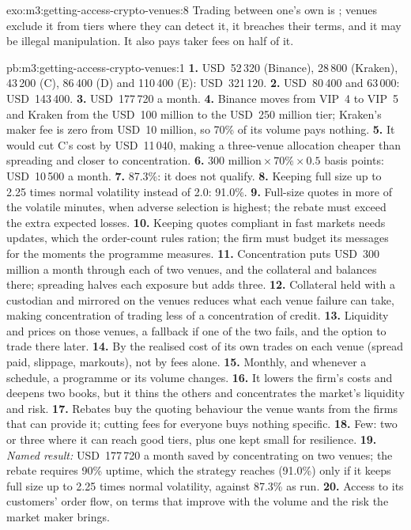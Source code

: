 \begin{solution}{exo:m3:getting-access-crypto-venues:8}
Trading between one's own  is ; venues exclude it from tiers where they can detect it, it breaches their terms, and it may
be illegal manipulation. It also pays taker fees on half of it.
\end{solution}

\begin{solution}{pb:m3:getting-access-crypto-venues:1}
\textbf{1.} USD~52\,320 (Binance), 28\,800 (Kraken), 43\,200 (C), 86\,400 (D) and 110\,400 (E): USD~321\,120. \textbf{2.} USD~80\,400 and
63\,000: USD~143\,400. \textbf{3.} USD~177\,720 a month. \textbf{4.} Binance moves from VIP~4 to VIP~5 and Kraken from the USD~100 million to the
USD~250 million tier; Kraken's maker fee is zero from USD~10 million, so 70\% of its volume pays nothing. \textbf{5.} It would cut C's cost by
USD~11\,040, making a three-venue allocation cheaper than spreading and closer to concentration. \textbf{6.} $300\text{ million} \times 70\% \times
0.5$ basis points: USD~10\,500 a month. \textbf{7.} 87.3\%: it does not qualify. \textbf{8.} Keeping full size up to 2.25 times normal volatility
instead of 2.0: 91.0\%. \textbf{9.} Full-size quotes in more of the volatile minutes, when adverse selection is highest; the rebate must exceed the
extra expected losses. \textbf{10.} Keeping quotes compliant in fast markets needs updates, which the order-count rules ration; the firm must budget
its messages for the moments the programme measures. \textbf{11.} Concentration puts USD~300 million a month through each of two venues, and the
collateral and balances there; spreading halves each exposure but adds three. \textbf{12.} Collateral held with a custodian and mirrored on the venues
reduces what each venue failure can take, making concentration of trading less of a concentration of credit. \textbf{13.} Liquidity and prices on
those venues, a fallback if one of the two fails, and the option to trade there later. \textbf{14.} By the realised cost of its own trades on each venue
(spread paid, slippage, markouts), not by fees alone. \textbf{15.} Monthly, and whenever a schedule, a programme or its volume changes. \textbf{16.}
It lowers the firm's costs and deepens two books, but it thins the others and concentrates the market's liquidity and risk. \textbf{17.} Rebates buy
the quoting behaviour the venue wants from the firms that can provide it; cutting fees for everyone buys nothing specific. \textbf{18.} Few: two or
three where it can reach good tiers, plus one kept small for resilience. \textbf{19.} \emph{Named result:} USD~177\,720 a month saved by concentrating
on two venues; the rebate requires 90\% uptime, which the strategy reaches (91.0\%) only if it keeps full size up to 2.25 times normal volatility,
against 87.3\% as run. \textbf{20.} Access to its customers' order flow, on terms that improve with the volume and the risk the market maker brings.
\end{solution}


